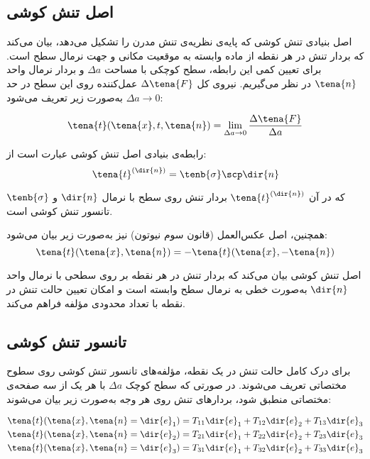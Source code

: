 \subsection{اصل تنش کوشی}

اصل بنیادی تنش کوشی که پایه‌ی نظریه‌ی تنش مدرن را تشکیل می‌دهد، بیان می‌کند که بردار تنش در هر نقطه از ماده وابسته به موقعیت مکانی و جهت نرمال سطح است. برای تعیین کمی این رابطه، سطح کوچکی با مساحت $\Delta a$ و بردار نرمال واحد $\tena{n}$ در نظر می‌گیریم. نیروی کل $\Delta \tena{F}$ عمل‌کننده روی این سطح در حد $\Delta a \to 0$ به‌صورت زیر تعریف می‌شود:

\begin{equation}
	\tena{t}(\tena{x}, t, \tena{n}) = \lim_{\Delta a \to 0} \frac{\Delta \tena{F}}{\Delta a}
\end{equation}

رابطه‌ی بنیادی اصل تنش کوشی عبارت است از:
\begin{equation}
	\tena{t}^{(\dir{n})} = \tenb{\sigma} \scp \dir{n}
\end{equation}

که در آن $\tena{t}^{(\dir{n})}$ بردار تنش روی سطح با نرمال $\dir{n}$ و $\tenb{\sigma}$ تانسور تنش کوشی است.

همچنین، اصل عکس‌العمل (قانون سوم نیوتون) نیز به‌صورت زیر بیان می‌شود:
\begin{equation}
	\tena{t}(\tena{x}, \tena{n}) = -\tena{t}(\tena{x}, -\tena{n})
\end{equation}

\begin{keypoint}
	اصل تنش کوشی بیان می‌کند که بردار تنش در هر نقطه بر روی سطحی با نرمال واحد $\dir{n}$ به‌صورت خطی به نرمال سطح وابسته است و امکان تعیین حالت تنش در نقطه با تعداد محدودی مؤلفه فراهم می‌کند.
\end{keypoint}

\subsection{تانسور تنش کوشی}

برای درک کامل حالت تنش در یک نقطه، مؤلفه‌های تانسور تنش کوشی روی سطوح مختصاتی تعریف می‌شوند. در صورتی که سطح کوچک $\Delta a$ با هر یک از سه صفحه‌ی مختصاتی منطبق شود، بردارهای تنش روی هر وجه به‌صورت زیر بیان می‌شوند:

\begin{align}
	\tena{t}(\tena{x}, \tena{n} = \dir{e}_1) & = T_{11} \dir{e}_1 + T_{12} \dir{e}_2 + T_{13} \dir{e}_3 \\
	\tena{t}(\tena{x}, \tena{n} = \dir{e}_2) & = T_{21} \dir{e}_1 + T_{22} \dir{e}_2 + T_{23} \dir{e}_3 \\
	\tena{t}(\tena{x}, \tena{n} = \dir{e}_3) & = T_{31} \dir{e}_1 + T_{32} \dir{e}_2 + T_{33} \dir{e}_3
\end{align}

